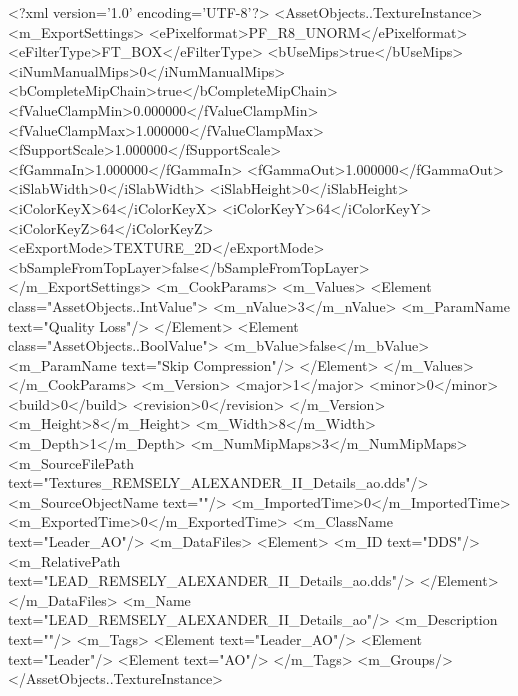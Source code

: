 <?xml version='1.0' encoding='UTF-8'?>
<AssetObjects..TextureInstance>
  <m_ExportSettings>
    <ePixelformat>PF_R8_UNORM</ePixelformat>
    <eFilterType>FT_BOX</eFilterType>
    <bUseMips>true</bUseMips>
    <iNumManualMips>0</iNumManualMips>
    <bCompleteMipChain>true</bCompleteMipChain>
    <fValueClampMin>0.000000</fValueClampMin>
    <fValueClampMax>1.000000</fValueClampMax>
    <fSupportScale>1.000000</fSupportScale>
    <fGammaIn>1.000000</fGammaIn>
    <fGammaOut>1.000000</fGammaOut>
    <iSlabWidth>0</iSlabWidth>
    <iSlabHeight>0</iSlabHeight>
    <iColorKeyX>64</iColorKeyX>
    <iColorKeyY>64</iColorKeyY>
    <iColorKeyZ>64</iColorKeyZ>
    <eExportMode>TEXTURE_2D</eExportMode>
    <bSampleFromTopLayer>false</bSampleFromTopLayer>
  </m_ExportSettings>
  <m_CookParams>
    <m_Values>
      <Element class="AssetObjects..IntValue">
        <m_nValue>3</m_nValue>
        <m_ParamName text="Quality Loss"/>
      </Element>
      <Element class="AssetObjects..BoolValue">
        <m_bValue>false</m_bValue>
        <m_ParamName text="Skip Compression"/>
      </Element>
    </m_Values>
  </m_CookParams>
  <m_Version>
    <major>1</major>
    <minor>0</minor>
    <build>0</build>
    <revision>0</revision>
  </m_Version>
  <m_Height>8</m_Height>
  <m_Width>8</m_Width>
  <m_Depth>1</m_Depth>
  <m_NumMipMaps>3</m_NumMipMaps>
  <m_SourceFilePath text="Textures\LEAD_REMSELY_ALEXANDER_II_Details_ao.dds"/>
  <m_SourceObjectName text=""/>
  <m_ImportedTime>0</m_ImportedTime>
  <m_ExportedTime>0</m_ExportedTime>
  <m_ClassName text="Leader_AO"/>
  <m_DataFiles>
    <Element>
      <m_ID text="DDS"/>
      <m_RelativePath text="LEAD_REMSELY_ALEXANDER_II_Details_ao.dds"/>
    </Element>
  </m_DataFiles>
  <m_Name text="LEAD_REMSELY_ALEXANDER_II_Details_ao"/>
  <m_Description text=""/>
  <m_Tags>
    <Element text="Leader_AO"/>
    <Element text="Leader"/>
    <Element text="AO"/>
  </m_Tags>
  <m_Groups/>
</AssetObjects..TextureInstance>
